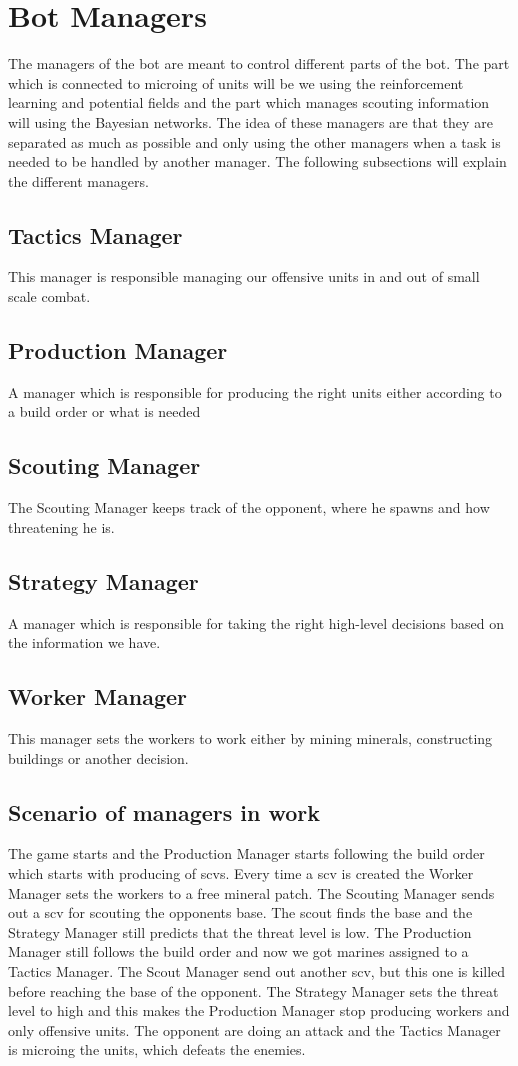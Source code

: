 \section{Bot Managers}
	\label{design::managers}
	The managers of the bot are meant to control different parts of the bot. The part which is connected to microing of units will be we using the 
	reinforcement learning and potential fields and the part which manages scouting information will using the Bayesian networks. 
	The idea of these managers are that they are separated as much as possible and only using the other managers when a task is needed to be handled 
	by another manager. The following subsections will explain the different managers.
	
	\subsection*{Tactics Manager}
		This manager is responsible managing our offensive units in and out of small scale combat.
	\subsection*{Production Manager}
		A manager which is responsible for producing the right units either according to a build order or what is needed
	\subsection*{Scouting Manager}
		The Scouting Manager keeps track of the opponent, where he spawns and how threatening he is.
	\subsection*{Strategy Manager}
		A manager which is responsible for taking the right high-level decisions based on the information we have.
	\subsection*{Worker Manager}
		This manager sets the workers to work either by mining minerals, constructing buildings or another decision.

	\subsection{Scenario of managers in work}
		The game starts and the Production Manager starts following the build order which starts with producing of scvs. Every time a scv is created the 
		Worker Manager sets the workers to a free mineral patch. The Scouting Manager sends out a scv for scouting the opponents base. The scout 
		finds the base and the Strategy Manager still predicts that the threat level is low. The Production Manager still follows the build order and now 
		we got marines assigned to a Tactics Manager. The Scout Manager send out another scv, but this one is killed before reaching the base of the 
		opponent. The Strategy Manager sets the threat level to high and this makes the Production Manager stop producing workers and only offensive units. 
		The opponent are doing an attack and the Tactics Manager is microing the units, which defeats the enemies.